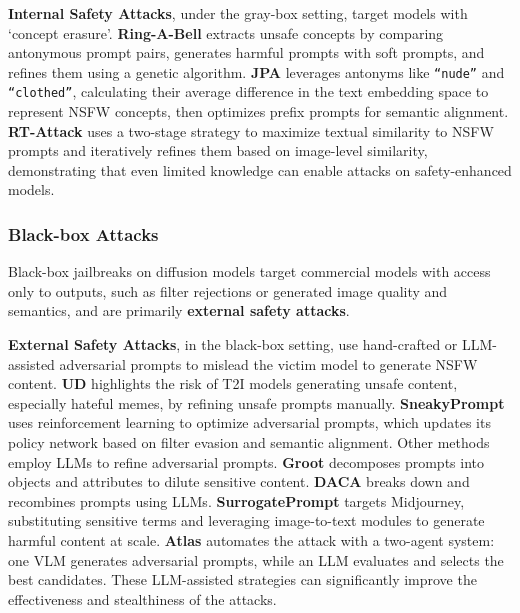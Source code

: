\textbf{Internal Safety Attacks}, under the gray-box setting, target models with `concept erasure'. \textbf{Ring-A-Bell} \cite{tsai2023ring} extracts unsafe concepts by comparing antonymous prompt pairs, generates harmful prompts with soft prompts, and refines them using a genetic algorithm. 
\textbf{JPA} \cite{ma2024jailbreaking} leverages antonyms like \texttt{“nude”} and \texttt{“clothed”}, calculating their average difference in the text embedding space to represent NSFW concepts, then optimizes prefix prompts for semantic alignment. \textbf{RT-Attack} \cite{gao2024rt} uses a two-stage strategy to maximize textual similarity to NSFW prompts and iteratively refines them based on image-level similarity, demonstrating that even limited knowledge can enable attacks on safety-enhanced models.

\subsubsection{Black-box Attacks}

Black-box jailbreaks on diffusion models target commercial models with access only to outputs, such as filter rejections or generated image quality and semantics, and are primarily \textbf{external safety attacks}. 

\textbf{External Safety Attacks}, in the black-box setting, use hand-crafted or LLM-assisted adversarial prompts to mislead the victim model to generate NSFW content.
\textbf{UD} \cite{qu2023unsafe} highlights the risk of T2I models generating unsafe content, especially hateful memes, by refining unsafe prompts manually. \textbf{SneakyPrompt} \cite{yang2024sneakyprompt} uses reinforcement learning to optimize adversarial prompts, which updates its policy network based on filter evasion and semantic alignment. Other methods employ LLMs to refine adversarial prompts.  \textbf{Groot} \cite{liu2024groot} decomposes prompts into objects and attributes to dilute sensitive content. \textbf{DACA} \cite{deng2023divide} breaks down and recombines prompts using LLMs. \textbf{SurrogatePrompt} \cite{ba2023surrogateprompt} targets Midjourney, substituting sensitive terms and leveraging image-to-text modules to generate harmful content at scale. \textbf{Atlas} \cite{dong2024jailbreaking} automates the attack with a two-agent system: one VLM generates adversarial prompts, while an LLM evaluates and selects the best candidates. These LLM-assisted strategies can significantly improve the effectiveness and stealthiness of the attacks.



